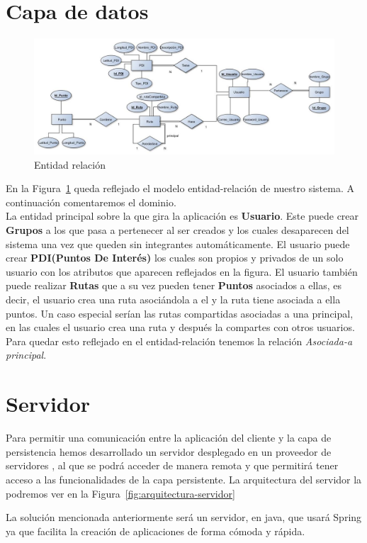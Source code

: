 \section{Capa de datos}
\begin{figure}[H]
		\centering
		\includegraphics[width=\textwidth] {BD.jpg}
		\caption{Entidad relación  }\label{fig:BD}
	\end{figure}
	En la Figura~\ref{fig:BD} queda reflejado el modelo  entidad-relación de nuestro sistema. A continuación comentaremos el dominio.\\
La entidad principal sobre la que gira la aplicación es \textbf{Usuario}. Este puede crear \textbf{Grupos} a los que pasa a pertenecer al ser creados y los cuales desaparecen del sistema una vez que queden sin integrantes automáticamente.  El usuario puede crear \textbf{PDI(Puntos De Interés)} los cuales son propios y privados de un solo usuario con los atributos que aparecen reflejados en la figura. El usuario también puede realizar \textbf{Rutas} que a su vez pueden tener \textbf{Puntos} asociados a ellas, es decir, el  usuario crea una ruta asociándola a el y la ruta tiene asociada a ella puntos.
 Un caso especial serían las rutas compartidas asociadas a una principal, en las cuales el usuario crea una ruta y después la compartes con otros usuarios. Para  quedar esto reflejado en el entidad-relación tenemos la relación \textit{Asociada-a principal}.
	
\section{Servidor}
Para permitir una comunicación entre la aplicación del cliente y la capa de persistencia hemos desarrollado un servidor desplegado en un proveedor de servidores , al que se podrá acceder de manera remota y que permitirá tener acceso a las funcionalidades de la capa persistente. La arquitectura del servidor la podremos ver en la Figura~\ref{fig:arquitectura-servidor}

La solución mencionada anteriormente será un servidor, en java, que  usará Spring ya que facilita la creación de aplicaciones de forma cómoda y rápida.\\

